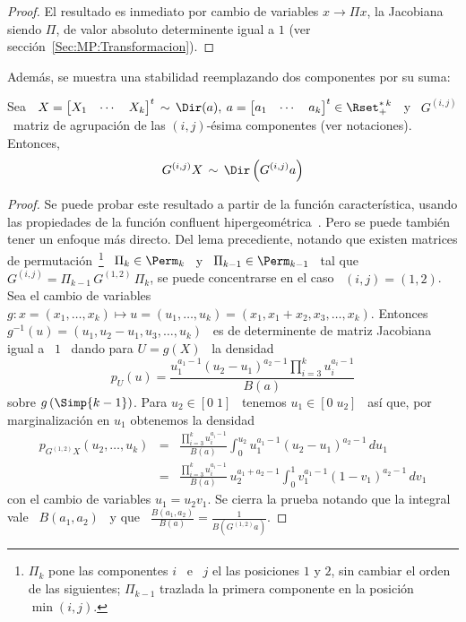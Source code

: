 %
\begin{proof}
  El resultado es inmediato por cambio  de variables $x \to \Pi x$, la Jacobiana
  siendo   $\Pi$,   de   valor   absoluto   determinente  igual   a   $1$   (ver
  secci\'on~\ref{Sec:MP:Transformacion}).
\end{proof}
%
Adem\'as, se muestra una stabilidad reemplazando dos componentes por su suma:
%
\begin{lema}\label{Lem:MP:StabSumaDir}
%
  Sea  \ $X =  \begin{bmatrix} X_1  & \cdots  & X_k  \end{bmatrix}^t \,  \sim \,
  \Dir(a),  \:  a =  \begin{bmatrix}  a_1 &  \cdots  &  a_k \end{bmatrix}^t  \in
  \Rset_+^{*  \,  k}$  \  y  \  $G^{(i,j)}$ \  matriz  de  agrupaci\'on  de  las
  $(i,j)$-\'esima componentes (ver notaciones). Entonces,
  \[
  G^{(i,j)} X \, \sim \, \Dir\left( G^{(i,j)} a \right)  
  \]
\end{lema}
%
\begin{proof}
  Se  puede probar  este resultado  a partir  de la  funci\'on caracter\'istica,
  usando      las      propiedades      de      la      funci\'on      confluent
  hipergeom\'etrica~\cite{SriKar85, Hum22, App25,  AppKam26, Erd37, Erd40}. Pero
  se  puede tambi\'en  tener un  enfoque m\'as  directo.  Del  lema precediente,
  notando  que  existen  matrices  de permutaci\'on~\footnote{$\Pi_k$  pone  las
    componentes $i$ \ e \ $j$ el  las posiciones $1$ y $2$, sin cambiar el orden
    de  las  siguientes;  $\Pi_{k-1}$  trazlada  la  primera  componente  en  la
    posici\'on $\min(i,j)$.}  \ $\Pi_k \in  \Perm_k$ \ y \ $\Pi_{k-1} \in
  \Perm_{k-1}$ \ tal que \ $G^{(i,j)} = \Pi_{k-1} \, G^{(1,2)} \, \Pi_k$,
  se puede concentrarse en el caso \ $(i,j) = (1,2)$. Sea el cambio de variables
  $g:    x    =    (x_1,\ldots,x_k)    \mapsto   u    =    (u_1,\ldots,u_k)    =
  (x_1,x_1+x_2,x_3,\ldots,x_k)$.        Entonces       \      $g^{-1}(u)       =
  (u_1,u_2-u_1,u_3,\ldots,u_k)$ \ es de determinente de matriz Jacobiana igual a
  \ $1$ \ dando para $U = g(X)$ \ la densidad
  \[
  p_U(u)  = \frac{u_1^{a_1-1}  \left(  u_2 -  u_1 \right)^{a_2-1}  \prod_{i=3}^k
    u_i^{a_i-1}}{B(a)}
  \]
  sobre $g\left(  \Simp{k-1} \right)$. Para $u_2  \in [0 \; 1]$  \ tenemos $u_1
  \in [  0 \;  u_2]$ \ as\'i  que, por  marginalizaci\'on en $u_1$  obtenemos la
  densidad
  \begin{eqnarray*}
  p_{G^{(1,2)} X}(u_2,\ldots,u_k) & = & \frac{\prod_{i=3}^k u_i^{a_i-1}}{B(a)}
  \int_0^{u_2} u_1^{a_1-1} \left( u_2 - u_1 \right)^{a_2-1} \, du_1\\[2mm]
  & = & \frac{\prod_{i=3}^k u_i^{a_i-1}}{B(a)} \, u_2^{a_1+a_2-1} \int_0^1
  v_1^{a_1-1} \left( 1 - v_1 \right)^{a_2-1} \, dv_1
  \end{eqnarray*}
  con el cambio de variables $u_1 = u_2 v_1$. Se cierra la prueba notando que la
  integral   vale  \  $B(a_1,a_2)$   \  y   que  \   $\frac{B(a_1,a_2)}{B(a)}  =
  \frac{1}{B\left( G^{(1,2)} a \right)}$.
\end{proof}

